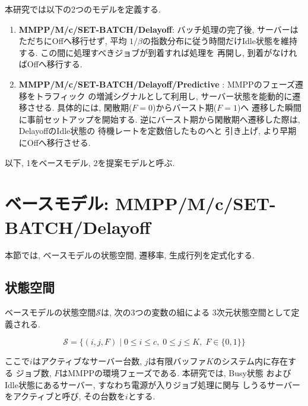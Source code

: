 \documentclass[a4paper, 11pt, dvipdfmx]{jsreport}
\begin{document}
本研究では以下の2つのモデルを定義する. 

\begin{enumerate}
    \item \textbf{MMPP/M/c/SET-BATCH/Delayoff}:
        バッチ処理の完了後, サーバーはただちにOffへ移行せず, 平均
$1/\beta$の指数分布に従う時間だけIdle状態を維持する. この間に処理すべきジョブが到着すれば処理を
再開し, 到着がなければOffへ移行する. 
    \item \textbf{MMPP/M/c/SET-BATCH/Delayoff/Predictive
        }: MMPPのフェーズ遷移をトラフィック
の増減シグナルとして利用し, サーバー状態を能動的に遷移させる. 
具体的には, 閑散期($F=0$)からバースト期($F=1$)へ
遷移した瞬間に事前セットアップを開始する. 
逆にバースト期から閑散期へ遷移した際は, DelayoffのIdle状態の
待機レートを定数倍したものへと
引き上げ, より早期にOffへ移行させる. 
\end{enumerate}
以下, 1をベースモデル, 2を提案モデルと呼ぶ. 

\section{ベースモデル: MMPP/M/c/SET-BATCH/Delayoff}
\label{sec:base-model}

本節では, ベースモデルの状態空間, 遷移率, 生成行列を定式化する. 

\subsection{状態空間}
\label{sec:state-space}
ベースモデルの状態空間$\mathcal{S}$は, 次の3つの変数の組による
3次元状態空間として定義される. 

\begin{equation}
    \mathcal{S} = \{(i, j, F) \mid 0 \le i \le c, \; 0 \le j \le K, \;
    F \in \{0, 1\}\}
\end{equation}

ここで$i$はアクティブなサーバー台数, $j$は有限バッファ$K$のシステム内に存在する
ジョブ数, $F$はMMPPの環境フェーズである. 本研究では, Busy状態
およびIdle状態にあるサーバー, すなわち電源が入りジョブ処理に関与
しうるサーバーをアクティブと呼び, その台数を$i$とする. 
\end{document}
